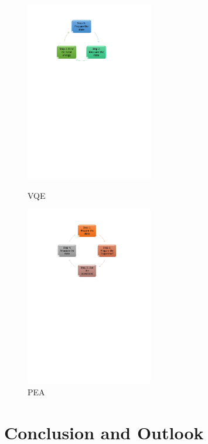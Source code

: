 \documentclass[14pt,landscape,color=UCLdarkred,margin=3cm]{uclposter}
\begin{document}
\begin{multicols}{3}
\begin{figure}[H]
  \begin{center}
  \begin{minipage}[c]{15em}
    \includegraphics[width=15em]{VQEdiagram.pdf}
    \caption{VQE}
  \end{minipage}
  \qquad
  \begin{minipage}[c]{15em}
    \includegraphics[width=15em]{PEA.pdf}
    \caption{PEA}
  \end{minipage}
  \end{center}

   
\end{figure}



\section*{Conclusion and Outlook}




\end{multicols}
\end{document}

